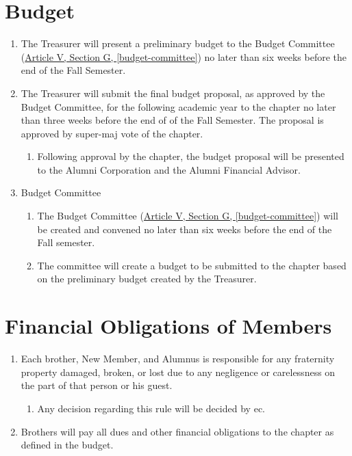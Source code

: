 \documentclass[]{article}
\begin{document}
\section{Budget}
	\label{budget}
	\begin{enumerate}
		\item The Treasurer will present a preliminary budget to the Budget Committee (\hyperref[budget-committee]{Article V, Section G, \autoref*{budget-committee}}) no later than six weeks before the end of the Fall Semester.
		\item The Treasurer will submit the final budget proposal, as approved by the Budget Committee, for the following academic year to the chapter no later than three weeks before the end of of the Fall Semester. The proposal is approved by \gls{super-maj} vote of the chapter.
			\begin{enumerate}
				\item Following approval by the chapter, the budget proposal will be presented to the Alumni Corporation and the Alumni Financial Advisor.
			\end{enumerate}

		\item Budget Committee
			\begin{enumerate}
				\item The Budget Committee (\hyperref[budget-committee]{Article V, Section G, \autoref*{budget-committee}}) will be created and convened no later than six weeks before the end of the Fall semester.
				\item The committee will create a budget to be submitted to the chapter based on the preliminary budget created by the Treasurer.
			\end{enumerate}
	\end{enumerate}

\section{Financial Obligations of Members}
\label{fin-obligations}

	\begin{enumerate}
		\item Each brother, New Member, and Alumnus is responsible for any fraternity property damaged, broken, or lost due to any negligence or carelessness on the part of that person or his guest. 
		\begin{enumerate}
			\item Any decision regarding this rule will be decided by \gls{ec}.
		\end{enumerate}

		\item Brothers will pay all dues and other financial obligations to the chapter as defined in the budget.

	\end{enumerate}
\end{document}
